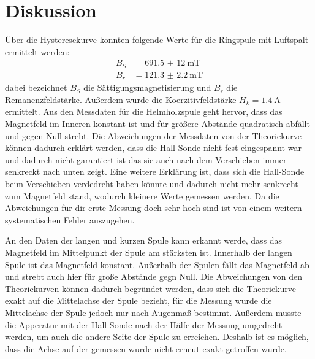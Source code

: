 \section{Diskussion}
Über die Hysteresekurve konnten folgende Werte für die
Ringspule mit Luftspalt ermittelt werden:
\begin{align*}
  B_{S} &=\SI{691,5(12)}{\milli\tesla} \\
  B_{r} &=\SI{121.3(22)}{\milli\tesla}
\end{align*}
\noindent dabei bezeichnet $B_{S}$ die Sättigungsmagnetisierung
und $B_{r}$ die Remanenzfeldstärke. Außerdem wurde die
Koerzitivfeldstärke $H_{k}=\SI{1,4}{\ampere}$
ermittelt.
\noindent Aus den Messdaten für die Helmholzspule geht hervor, dass
das Magnetfeld im Inneren konstant ist und für größere
Abstände quadratisch abfällt und gegen Null strebt.
Die Abweichungen der Messdaten von der Theoriekurve können
dadurch erklärt werden, dass die Hall-Sonde nicht
fest eingespannt war und dadurch nicht garantiert ist
das sie auch nach dem Verschieben immer senkreckt nach
unten zeigt. Eine weitere Erklärung ist, dass sich die
Hall-Sonde beim Verschieben verdedreht haben könnte
und dadurch nicht mehr senkrecht zum Magnetfeld stand, wodurch
kleinere Werte gemessen werden.
\noindent Da die Abweichungen für dir erste Messung doch sehr hoch sind
ist von einem weitern systematischen Fehler auszugehen.

\noindent An den Daten der langen und kurzen Spule  kann erkannt
werde, dass das Magnetfeld im Mittelpunkt der Spule am
stärksten ist. Innerhalb der langen Spule ist das
Magnetfeld konstant. Außerhalb der Spulen fällt das
Magnetfeld ab und strebt auch hier für große
Abstände gegn Null.
\noindent Die Abweichungen von den Theoriekurven können dadurch begründet
werden, dass sich die Theoriekurve exakt auf die
Mittelachse der Spule bezieht, für die Messung wurde
die Mittelachse der Spule jedoch nur nach Augenmaß bestimmt.
Außerdem musste die Apperatur mit der Hall-Sonde nach der
Hälfe der Messung umgedreht werden, um auch die andere
Seite der Spule zu erreichen. Deshalb ist es möglich, dass
die Achse auf der gemessen wurde nicht erneut exakt
getroffen wurde.





\label{sec:Diskussion}
